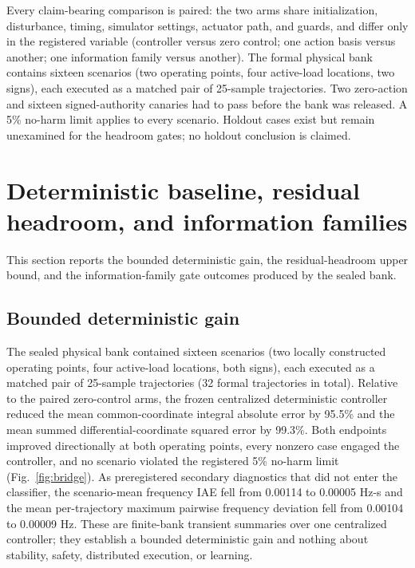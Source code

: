 \documentclass[journal]{IEEEtran}
\begin{document}
Every claim-bearing comparison is paired: the two arms share initialization, disturbance, timing, simulator settings, actuator path, and guards, and differ only in the registered variable (controller versus zero control; one action basis versus another; one information family versus another). The formal physical bank contains sixteen scenarios (two operating points, four active-load locations, two signs), each executed as a matched pair of 25-sample trajectories. Two zero-action and sixteen signed-authority canaries had to pass before the bank was released. A 5\% no-harm limit applies to every scenario. Holdout cases exist but remain unexamined for the headroom gates; no holdout conclusion is claimed.

\section{Deterministic baseline, residual headroom, and information families}
\label{sec:results}

This section reports the bounded deterministic gain, the residual-headroom upper bound, and the information-family gate outcomes produced by the sealed bank.

\subsection{Bounded deterministic gain}
\label{sec:deterministic-gain}

The sealed physical bank contained sixteen scenarios (two locally constructed operating points, four active-load locations, both signs), each executed as a matched pair of 25-sample trajectories (32 formal trajectories in total). Relative to the paired zero-control arms, the frozen centralized deterministic controller reduced the mean common-coordinate integral absolute error by 95.5\% and the mean summed differential-coordinate squared error by 99.3\%. Both endpoints improved directionally at both operating points, every nonzero case engaged the controller, and no scenario violated the registered 5\% no-harm limit (Fig.~\ref{fig:bridge}). As preregistered secondary diagnostics that did not enter the classifier, the scenario-mean frequency IAE fell from 0.00114 to 0.00005 Hz-s and the mean per-trajectory maximum pairwise frequency deviation fell from 0.00104 to 0.00009 Hz. These are finite-bank transient summaries over one centralized controller; they establish a bounded deterministic gain and nothing about stability, safety, distributed execution, or learning.
\end{document}
